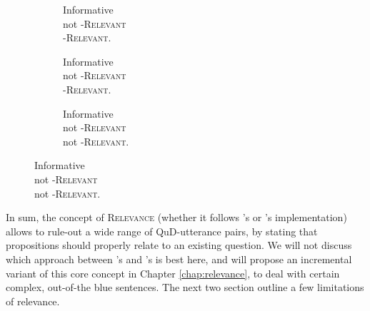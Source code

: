 \begin{figure}[H]\ContinuedFloat
	\begin{subfigure}[b]{.3\linewidth}
		\centering
		\caption{Informative\\not \textsc{\citeauthor{Lewis1988}-Relevant}\\ \textsc{\citeauthor{Roberts2012}-Relevant}.}\label{fig1:sub-cell-relevant}
	\end{subfigure}\hfill
	\begin{subfigure}[b]{.3\linewidth}
		\centering
		\caption{Informative\\not \textsc{\citeauthor{Lewis1988}-Relevant}\\ \textsc{\citeauthor{Roberts2012}-Relevant}.}\label{fig1:sub-1-cell-relevant}
	\end{subfigure}\hfill
	\begin{subfigure}[b]{.33\linewidth}
		\centering
		\caption{Informative\\not \textsc{\citeauthor{Lewis1988}-Relevant}\\not \textsc{\citeauthor{Roberts2012}-Relevant}.}\label{fig1:not-relevant}
	\end{subfigure}
\end{figure}

In sum, the concept of \textsc{Relevance} (whether it follows \citeauthor{Lewis1988}'s or \citeauthor{Roberts2012}'s implementation) allows to rule-out a wide range of QuD-utterance pairs, by stating that propositions should properly relate to an existing question. We will not discuss which approach between \citeauthor{Lewis1988}'s and \citeauthor{Roberts2012}'s is best here, and will propose an incremental variant of this core concept in Chapter \ref{chap:relevance}, to deal with certain complex, out-of-the blue sentences. The next two section outline a few limitations of relevance.

